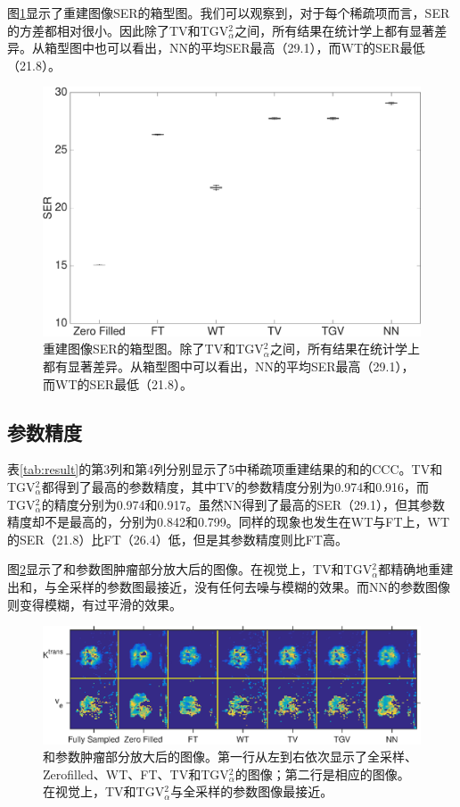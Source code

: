 图\ref{fig:boxplot}显示了重建图像SER的箱型图。我们可以观察到，对于每个稀疏项而言，SER的方差都相对很小。因此除了TV和TGV$_\alpha^2$之间，所有结果在统计学上都有显著差异。从箱型图中也可以看出，NN的平均SER最高（29.1），而WT的SER最低（21.8）。

\begin{figure}[htbp]
\centerline{
    \includegraphics[width=1\textwidth]{img/qetsr/figure3.eps}
}
\caption{
重建图像SER的箱型图。除了TV和TGV$_\alpha^2$之间，所有结果在统计学上都有显著差异。从箱型图中可以看出，NN的平均SER最高（29.1），而WT的SER最低（21.8）。
}
\label{fig:boxplot}
\end{figure}

\subsection{参数精度}
表\ref{tab:result}的第3列和第4列分别显示了5中稀疏项重建结果的\kt 和\Ve 的CCC。TV和TGV$_\alpha^2$都得到了最高的参数精度，其中TV的参数精度分别为0.974和0.916，而TGV$_\alpha^2$的精度分别为0.974和0.917。虽然NN得到了最高的SER（29.1），但其参数精度却不是最高的，分别为0.842和0.799。同样的现象也发生在WT与FT上，WT的SER（21.8）比FT（26.4）低，但是其参数精度则比FT高。

图\ref{fig:zoom}显示了\kt 和\Ve 参数图肿瘤部分放大后的图像。在视觉上，TV和TGV$_\alpha^2$都精确地重建出\kt 和\Ve，与全采样的参数图最接近，没有任何去噪与模糊的效果。而NN的参数图像则变得模糊，有过平滑的效果。

\begin{figure}[htbp]
\centerline{\includegraphics[width=1.0\textwidth]{img/qetsr/figure4.eps}}
\centering
\caption{
\kt 和\Ve 参数肿瘤部分放大后的图像。第一行从左到右依次显示了全采样、Zerofilled、WT、FT、TV和TGV$_{\alpha}^2$的\kt 图像；第二行是相应的\Ve 图像。在视觉上，TV和TGV$_{\alpha}^2$与全采样的参数图像最接近。
}
\label{fig:zoom}
\end{figure}

